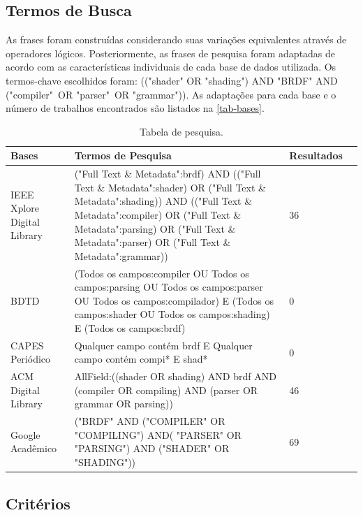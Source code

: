 \subsection{Termos de Busca}
 As frases foram construídas considerando suas variações equivalentes através de operadores lógicos. Posteriormente, as frases de pesquisa foram adaptadas de acordo com as características individuais de cada base de dados utilizada. Os termos-chave escolhidos foram: (("shader" OR "shading") AND "BRDF" AND ("compiler"\ OR "parser"\ OR "grammar")). As adaptações para cada base e o número de trabalhos encontrados são listados na \autoref{tab-bases}.



\begin{table}[H]
\ABNTEXfontereduzida
\caption{\small Tabela de pesquisa.}
\label{tab-bases}
\begin{tabular}{p{2.6cm}|p{6.0cm}|p{2.25cm}|p{3.40cm}}
   \textbf{Bases} & \textbf{Termos de Pesquisa}  & \textbf{Resultados}\\
   \hline
    IEEE Xplore Digital Library
    &
    ("Full Text \& Metadata":brdf)
AND (("Full Text \& Metadata":shader) OR  ("Full Text \& Metadata":shading))
AND (("Full Text \& Metadata":compiler) OR  ("Full Text \& Metadata":parsing) OR  ("Full Text \& Metadata":parser) OR  ("Full Text \& Metadata":grammar))
   & 36
    \\ \hline


    BDTD
    & (Todos os campos:compiler OU Todos os campos:parsing OU Todos os campos:parser OU Todos os campos:compilador) E (Todos os campos:shader OU Todos os campos:shading) E (Todos os campos:brdf)
    & 0
    \\ \hline
    CAPES Periódico
    &  Qualquer campo contém brdf E 
 Qualquer campo contém compi* E shad*  
    & 0
    \\ \hline


  ACM Digital Library
  & AllField:((shader OR shading) AND brdf AND (compiler OR compiling) AND (parser OR grammar OR parsing))
  & 46
    \\ \hline


 Google Acadêmico
  & 
  ("BRDF" AND ("COMPILER" OR "COMPILING") AND( "PARSER" OR "PARSING") AND ("SHADER" OR "SHADING"))
  & 69
\end{tabular}
\end{table}


\subsection{Critérios}


